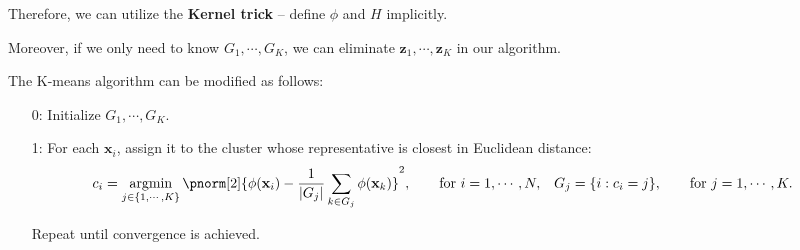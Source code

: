 \documentclass{huhtakm-template-book-v2}
\DeclareMathOperator*{\argmin}{argmin}
\begin{document}
\begin{enumerate}
        Therefore, we can utilize the \textbf{Kernel trick} -- define $\phi$ and $H$ implicitly.
        
        Moreover, if we only need to know $G_{1},\cdots,G_{K}$, we can eliminate $\mathbf{z}_{1},\cdots,\mathbf{z}_{K}$ in our algorithm.
    \end{enumerate}

    The K-means algorithm can be modified as follows:
    \begin{itemize}
        \item[0:] Initialize $G_{1}, \cdots, G_{K}$.
        \item[1:] For each $\mathbf{x}_{i}$, assign it to the cluster whose representative is closest in Euclidean distance:
        \begin{align*}
            c_{i} &= \argmin_{j \in \{1, \cdots, K\}}\pnorm[2]{\phi(\mathbf{x}_{i}) - \frac{1}{\abs{G_{j}}}\sum_{k\in G_{j}}\phi(\mathbf{x}_{k})}^{2}, \qquad \text{for } i = 1, \cdots, N, & G_{j} &= \{i : c_{i} = j\}, \qquad \text{for } j = 1, \cdots, K.
        \end{align*}
        \item[] Repeat until convergence is achieved.
    \end{itemize}
    \newpage
    
\end{document}
